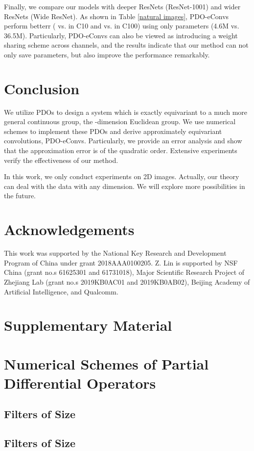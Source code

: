 \documentclass{article}
\begin{document}
Finally, we compare our models with deeper ResNets (ResNet-1001) and wider ResNets (Wide ResNet). As shown in Table \ref{natural images}, PDO-eConvs perform betterr ( vs.   in C10 and  vs.  in C100) using only  parameters (4.6M vs. 36.5M). Particularly, PDO-eConvs can also be viewed as introducing a weight sharing scheme across channels, and the results indicate that our method can not only save parameters, but also improve the performance remarkably.

\section{Conclusion}

We utilize PDOs to design a system which is exactly equivariant to a much more general continuous group, the -dimension Euclidean group. We use numerical schemes to implement these PDOs and derive approximately equivariant convolutions, PDO-eConvs. Particularly, we provide an error analysis and show that the approximation error is of the quadratic order. Extensive experiments verify the effectiveness of our method.

In this work, we only conduct experiments on 2D images. Actually, our theory can deal with the data with any dimension. We will explore more possibilities in the future.

\section*{Acknowledgements}
This work was supported by the National Key Research and Development Program of China under grant 2018AAA0100205. Z. Lin is supported by NSF China (grant no.s 61625301 and 61731018), Major Scientific Research Project of Zhejiang Lab (grant no.s 2019KB0AC01 and 2019KB0AB02), Beijing Academy of Artificial Intelligence, and Qualcomm.





\appendix
\section*{Supplementary Material}
\section{Numerical Schemes of Partial Differential Operators}
\subsection{Filters of Size }



\subsection{Filters of Size }
\end{document}

